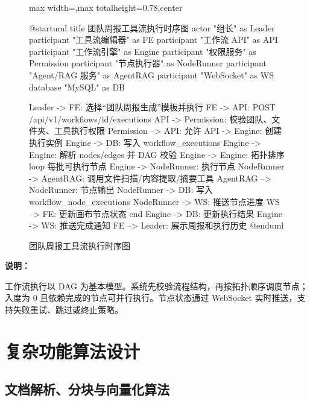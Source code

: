 \documentclass[a4paper,zihao=-4]{ctexart}
\begin{document}
\begin{figure}[H]
\centering
\begin{adjustbox}{max width=\linewidth,max totalheight=0.78\textheight,center}
\begingroup
\renewcommand{\PlantUMLJobname}{plantuml-diagrams/req-uml-06}
\begin{plantuml}
@startuml
title 团队周报工具流执行时序图
actor "组长" as Leader
participant "工具流编辑器" as FE
participant "工作流 API" as API
participant "工作流引擎" as Engine
participant "权限服务" as Permission
participant "节点执行器" as NodeRunner
participant "Agent/RAG 服务" as AgentRAG
participant "WebSocket" as WS
database "MySQL" as DB

Leader -> FE: 选择“团队周报生成”模板并执行
FE -> API: POST /api/v1/workflows/{id}/executions
API -> Permission: 校验团队、文件夹、工具执行权限
Permission --> API: 允许
API -> Engine: 创建执行实例
Engine -> DB: 写入 workflow_executions
Engine -> Engine: 解析 nodes/edges 并 DAG 校验
Engine -> Engine: 拓扑排序
loop 每批可执行节点
  Engine -> NodeRunner: 执行节点
  NodeRunner -> AgentRAG: 调用文件扫描/内容提取/摘要工具
  AgentRAG --> NodeRunner: 节点输出
  NodeRunner -> DB: 写入 workflow_node_executions
  NodeRunner -> WS: 推送节点进度
  WS --> FE: 更新画布节点状态
end
Engine -> DB: 更新执行结果
Engine -> WS: 推送完成通知
FE --> Leader: 展示周报和执行历史
@enduml
\end{plantuml}
\endgroup
\end{adjustbox}
\caption{团队周报工具流执行时序图}
\end{figure}

\textbf{说明：}

工作流执行以 DAG
为基本模型。系统先校验流程结构，再按拓扑顺序调度节点；入度为 0
且依赖完成的节点可并行执行。节点状态通过 WebSocket
实时推送，支持失败重试、跳过或终止策略。

\hypertarget{ux590dux6742ux529fux80fdux7b97ux6cd5ux8bbeux8ba1}{%
\section{复杂功能算法设计}\label{ux590dux6742ux529fux80fdux7b97ux6cd5ux8bbeux8ba1}}

\hypertarget{ux6587ux6863ux89e3ux6790ux5206ux5757ux4e0eux5411ux91cfux5316ux7b97ux6cd5}{%
\subsection{文档解析、分块与向量化算法}\label{ux6587ux6863ux89e3ux6790ux5206ux5757ux4e0eux5411ux91cfux5316ux7b97ux6cd5}}
\end{document}
